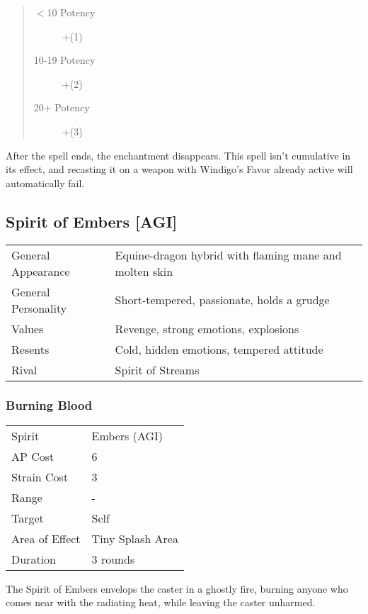 \documentclass[11pt,a4paper,twocolumn]{book}
\begin{document}
\begin{quote}
	\begin{description}
		\item[$<$10 Potency] 	+(1)
		\item[10-19 Potency] 	+(2)
		\item[20+ Potency] 	    +(3)
	\end{description}
\end{quote}

After the spell ends, the enchantment disappears. This spell isn't cumulative in its effect, and recasting it on a weapon with Windigo's Favor already active will automatically fail.

\subsection*{Spirit of Embers [AGI]}
{
	\begin{tabu} to 75mm{| X[l,4] | X[l,8] |}
		\hline
		General Appearance  & Equine-dragon hybrid with flaming mane and molten skin \\
		General Personality & Short-tempered, passionate, holds a grudge             \\
		Values              & Revenge, strong emotions, explosions                   \\
		Resents             & Cold, hidden emotions, tempered attitude               \\
		Rival               & Spirit of Streams                                      \\ \hline
	\end{tabu}
	
}

\medskip

\subsubsection*{Burning Blood}
{
	\begin{tabu} to 75mm{| X[l,4] | X[l,7] |}
		\hline
		Spirit         & Embers (AGI)     \\
		AP Cost        & 6                \\
		Strain Cost    & 3                \\
		Range          & -                \\
		Target         & Self             \\
		Area of Effect & Tiny Splash Area \\
		Duration       & 3 rounds         \\ \hline
	\end{tabu}
	
}
\medskip
The Spirit of Embers envelops the caster in a ghostly fire, burning anyone who comes near with the radiating heat, while leaving the caster unharmed.
\end{document}
